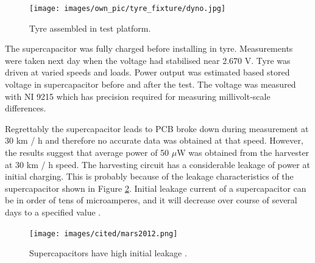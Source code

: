 \begin{figure}[htb]
\begin{center}
\texttt{[image: images/own\_pic/tyre\_fixture/dyno.jpg]}
\end{center}
\caption{\label{fig:tyre_platform} Tyre assembled in test platform.}
\end{figure}

The supercapacitor was fully charged before installing in tyre. Measurements were taken next day when the voltage had stabilised near 2.670 V. Tyre was driven at varied speeds and loads. Power output was estimated based stored voltage in supercapacitor before and after the test. The voltage was measured with NI 9215 \cite{ni9215} which has precision required for measuring millivolt-scale differences. 

\begin{table}[htb]
\caption{\label{tbl:piezo_harvester_tyre_output} Measured values from tyre test setup.}
\begin{center}
\end{center}
\end{table}

Regrettably the supercapacitor leads to PCB broke down during measurement at 30 km / h and therefore no accurate data was obtained at that speed. However, the results suggest that average power of 50 $\mu$W was obtained from the harvester at 30 km / h speed. The harvesting circuit has a considerable leakage of power at initial charging. This is probably because of the leakage characteristics of the supercapacitor shown in Figure \ref{fig:scap_leakage}. Initial leakage current of a supercapacitor can be in order of tens of microamperes, and it will decrease over course of several days to a specified value \cite{Mars2012}.

\begin{figure}[htb]
\begin{center}
\texttt{[image: images/cited/mars2012.png]}
\end{center}
\caption{\label{fig:scap_leakage} Supercapacitors have high initial leakage \cite{Mars2012}.}
\end{figure}

